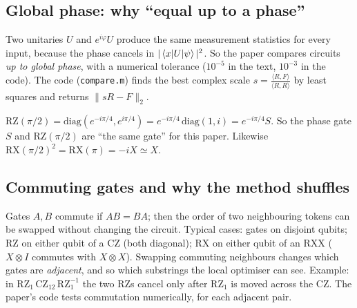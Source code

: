 \documentclass[11pt,a4paper]{article}
\newcommand{\RX}{\mathrm{RX}}\newcommand{\RY}{\mathrm{RY}}\newcommand{\RZ}{\mathrm{RZ}}
\newcommand{\RXX}{\mathrm{RXX}}\newcommand{\CZ}{\mathrm{CZ}}\newcommand{\CNOT}{\mathrm{CNOT}}
\begin{document}
\subsection{Global phase: why ``equal up to a phase''}
Two unitaries $U$ and $e^{i\varphi}U$ produce the same measurement statistics for every input, because the phase cancels
in $|\braket{x|U|\psi}|^2$. So the paper compares circuits \emph{up to global phase}, with a numerical tolerance
($10^{-5}$ in the text, $10^{-3}$ in the code). The code (\texttt{compare.m}) finds the best complex scale
$s=\frac{\langle R,F\rangle}{\langle R,R\rangle}$ by least squares and returns $\|sR-F\|_2$.
\begin{example}
$\RZ(\pi/2)=\mathrm{diag}(e^{-i\pi/4},e^{i\pi/4})=e^{-i\pi/4}\,\mathrm{diag}(1,i)=e^{-i\pi/4}S$. So the phase gate $S$ and
$\RZ(\pi/2)$ are ``the same gate'' for this paper. Likewise $\RX(\pi/2)^2=\RX(\pi)=-iX\simeq X$.
\end{example}

\subsection{Commuting gates and why the method shuffles}
Gates $A,B$ commute if $AB=BA$; then the order of two neighbouring tokens can be swapped without changing the circuit.
Typical cases: gates on disjoint qubits; $\RZ$ on either qubit of a $\CZ$ (both diagonal); $\RX$ on either qubit
of an $\RXX$ ($X\otimes I$ commutes with $X\otimes X$). Swapping commuting neighbours changes which gates are
\emph{adjacent}, and so which substrings the local optimiser can see. Example: in $\RZ_1\,\CZ_{12}\,\RZ_1^{-1}$
the two $\RZ$s cancel only after $\RZ_1$ is moved across the $\CZ$. The paper's code tests commutation numerically,
for each adjacent pair.
\end{document}
